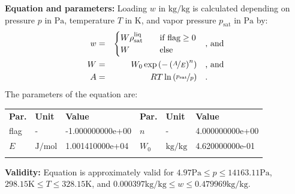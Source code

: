 \textbf{Equation and parameters:}
\newline
%
Loading $w$ in $\si{\kilogram\per\kilogram}$ is calculated depending on pressure $p$ in $\si{\pascal}$, temperature $T$ in $\si{\kelvin}$, and vapor pressure $p_\mathrm{sat}$ in $\si{\pascal}$ by:
%
\begin{equation*}
\begin{split}
w &=& \begin{cases} W \rho_\mathrm{sat}^{\mathrm{liq}} & \quad \text{if flag} \geq 0 \\ W & \quad \text{else} \end{cases} & \quad\text{, and} \\
W &=& W_0 \exp \left( - \left( \nicefrac{A}{E} \right) ^{n} \right) & \quad\text{, and} \\
A &=& R T \ln \left( \nicefrac{p_\mathrm{sat}}{p} \right) & \quad\text{.} \\
\end{split}
\end{equation*}
%
The parameters of the equation are:
%
\begin{longtable}[l]{lll|lll}
\toprule
\addlinespace
\textbf{Par.} & \textbf{Unit} & \textbf{Value} &	\textbf{Par.} & \textbf{Unit} & \textbf{Value} \\
\addlinespace
\midrule
\endhead

\bottomrule
\endfoot
\bottomrule
\endlastfoot
\addlinespace

flag & - & -1.000000000e+00 & $n$ & - & 4.000000000e+00 \\
$E$ & $\si{\joule\per\mole}$ & 1.001410000e+04 & $W_0$ & $\si{\kilogram\per\kilogram}$ & 4.620000000e-01 \\

\addlinespace\end{longtable}

\textbf{Validity:}
\newline
Equation is approximately valid for $4.97 \si{\pascal} \leq p \leq 14163.11 \si{\pascal}$,  $298.15 \si{\kelvin} \leq T \leq 328.15 \si{\kelvin}$, and $0.000397 \si{\kilogram\per\kilogram} \leq w \leq 0.479969 \si{\kilogram\per\kilogram}$.
\newline

